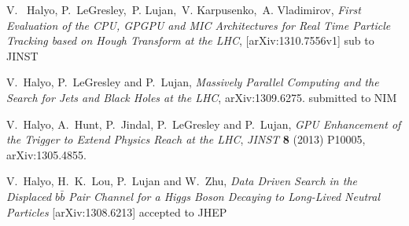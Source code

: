 \documentclass[a4paper,11pt]{article}
\begin{document}
\begin{thebibliography}{99}


{V. ~Halyo, P.~LeGresley,~P. Lujan,~V. Karpusenko,~A. Vladimirov,
\emph{First Evaluation of the CPU, GPGPU and MIC Architectures for Real Time Particle Tracking based on Hough Transform at the LHC},
[arXiv:1310.7556v1] sub to JINST}

{ V.~Halyo, P.~LeGresley and P.~Lujan,
\emph{Massively Parallel Computing and the Search for Jets and Black Holes at the LHC},
  arXiv:1309.6275. submitted to NIM}


{  V.~Halyo, A.~Hunt, P.~Jindal, P.~LeGresley and P.~Lujan,
\emph{GPU Enhancement of the Trigger to Extend Physics Reach at the LHC},  \emph{JINST} {\bf 8} (2013) P10005, arXiv:1305.4855.}

{ V.~Halyo, H.~K.~Lou, P.~Lujan and W.~Zhu,
\emph{Data Driven Search in the Displaced $b\bar{b}$ Pair Channel for a Higgs Boson Decaying to Long-Lived Neutral Particles} 
 [arXiv:1308.6213] accepted to JHEP}








\end{thebibliography}
\end{document}

